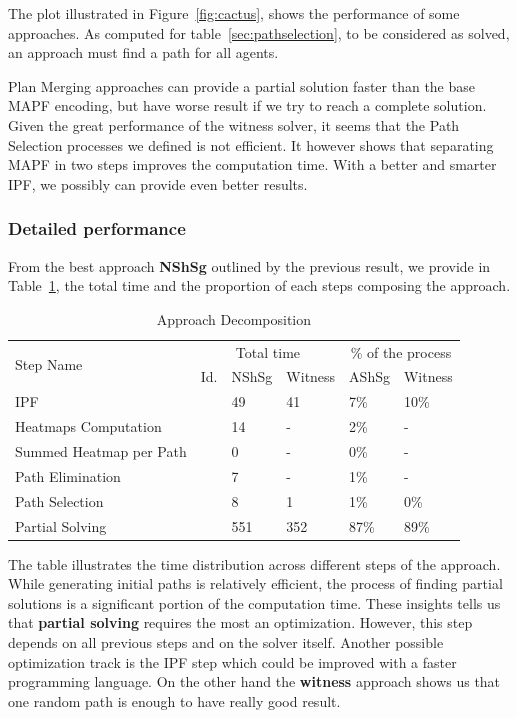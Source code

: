 The plot illustrated in Figure~\ref{fig:cactus}, shows the performance of some approaches. As computed for table~\ref{sec:pathselection}, to be considered as solved, an approach must find a path for all agents. 

Plan Merging approaches can provide a partial solution faster than the base MAPF encoding, but have worse result if we try to reach a complete solution. Given the great performance of the witness solver, it seems that the Path Selection processes we defined is not efficient. It however shows that separating MAPF in two steps improves the computation time. With a better and smarter IPF, we possibly can provide even better results.


\subsubsection{Detailed performance}

From the best approach \textbf{NShSg} outlined by the previous result, we provide in Table~\ref{tbl:approach_decomposition}, the total time and the proportion of each steps composing the approach.

\begin{table}[]
    \centering
    \caption{Approach Decomposition}\label{tbl:approach_decomposition}
    \begin{tabular}{@{}llllll@{}}
    \toprule
    \multicolumn{1}{l|}{\multirow{2}{*}{Step Name}} & \multicolumn{3}{c|}{Total time} & \multicolumn{2}{c}{\% of the process} \\ \cmidrule(l){2-6}  
    \multicolumn{1}{l|}{} & \multicolumn{1}{l|}{Id.} & \multicolumn{1}{c}{NShSg} & \multicolumn{1}{c|}{Witness} & \multicolumn{1}{c}{AShSg} & Witness \\ \midrule
    IPF & \cellcolor{lightgrey} & 49 & 41  &7\% &10\%  \\
    Heatmaps Computation & \cellcolor{lightgrey} & 14 &  - &2\% & - \\
    Summed Heatmap per Path & \cellcolor{lightgrey} & 0 &  - &0\% & - \\
    Path Elimination & \cellcolor{lightgrey} & 7 &  - &1\% & - \\
    Path Selection & \cellcolor{lightgrey} & 8 & 1  &1\% &0\%  \\
    Partial Solving & \cellcolor{lightgrey} & 551 & 352  &87\% &89\%  \\
    \end{tabular}
    \end{table}

    
The table illustrates the time distribution across different steps of the approach. While generating initial paths is relatively efficient, the process of finding partial solutions is a significant portion of the computation time. These insights tells us that  \textbf{partial solving} requires the most an optimization. However, this step depends on all previous steps and on the solver itself. Another possible optimization track is the IPF step which could be improved with a faster programming language. On the other hand the \textbf{witness} approach shows us that one random path is enough to have really good result. 



